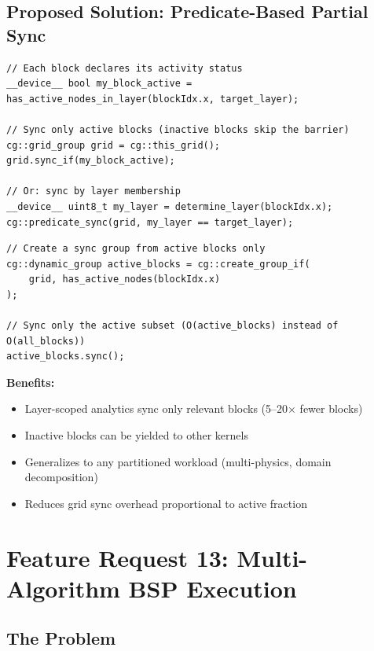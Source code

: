 \documentclass[11pt,a4paper]{article}
\newenvironment{benefitsbox}{%
    \vspace{6pt}%
    \noindent\textbf{Benefits:}%
    \begin{itemize}[leftmargin=1.5em,topsep=2pt,itemsep=1pt]%
}{%
    \end{itemize}%
    \vspace{6pt}%
}
\begin{document}
\subsection{Proposed Solution: Predicate-Based Partial Sync}

\begin{lstlisting}[style=cstyle,title={Sync only blocks that match a predicate}]
// Each block declares its activity status
__device__ bool my_block_active = has_active_nodes_in_layer(blockIdx.x, target_layer);

// Sync only active blocks (inactive blocks skip the barrier)
cg::grid_group grid = cg::this_grid();
grid.sync_if(my_block_active);

// Or: sync by layer membership
__device__ uint8_t my_layer = determine_layer(blockIdx.x);
cg::predicate_sync(grid, my_layer == target_layer);
\end{lstlisting}

\begin{lstlisting}[style=cstyle,title={Alternative: dynamic sync groups}]
// Create a sync group from active blocks only
cg::dynamic_group active_blocks = cg::create_group_if(
    grid, has_active_nodes(blockIdx.x)
);

// Sync only the active subset (O(active_blocks) instead of O(all_blocks))
active_blocks.sync();
\end{lstlisting}

\begin{benefitsbox}
    \item Layer-scoped analytics sync only relevant blocks (5--20$\times$ fewer blocks)
    \item Inactive blocks can be yielded to other kernels
    \item Generalizes to any partitioned workload (multi-physics, domain decomposition)
    \item Reduces grid sync overhead proportional to active fraction
\end{benefitsbox}

\newpage

\section{Feature Request 13: Multi-Algorithm BSP Execution}

\subsection{The Problem}
\end{document}
